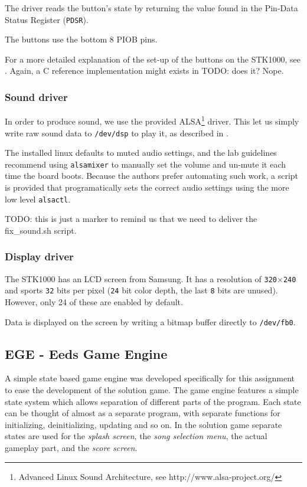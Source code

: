 The driver reads the button's state by returning the value found in the Pin-Data Status Register (\texttt{PDSR}).

The buttons use the bottom 8 PIOB pins.

For a more detailed explanation of the set-up of the buttons on the STK1000, see \cite{tdt4258-1}. Again, a C reference implementation might exists in \cite{4258-2} TODO: does it? Nope.

\subsubsection{Sound driver}
In order to produce sound, we use the provided ALSA\footnote{Advanced Linux Sound Architecture, see http://www.alsa-project.org/} driver.
This let us simply write raw sound data to \texttt{/dev/dsp} to play it, as described in \cite{lab-compendium}.

The installed linux defaults to muted audio settings, and the lab guidelines recommend using \texttt{alsamixer} to manually set the volume and un-mute it each time the board boots.
Because the authors prefer automating such work, a script is provided that programatically sets the correct audio settings using the more low level \texttt{alsactl}.

TODO: this is just a marker to remind us that we need to deliver the fix_sound.sh script.

\subsubsection{Display driver}
The STK1000 has an LCD screen from Samsung.
It has a resolution of \texttt{320}$\times$\texttt{240} and sports \texttt{32} bits per pixel (\texttt{24} bit color depth, the last \texttt{8} bits are unused)\cite{lab-compendium}.
However, only 24 of these are enabled by default\cite{avr32-disp}.

Data is displayed on the screen by writing a bitmap buffer directly to \texttt{/dev/fb0}.


    \subsection{EGE  - Eeds Game Engine}

    A simple state based game engine was developed specifically for this assignment to ease the development of the solution game.
    The game engine features a simple state system which allows separation of different parts of the program.
    Each state can be thought of almost as a separate program, with separate functions for initializing, deinitializing, updating and so on.
    In the solution game separate states are used for the \textit{splash screen}, the \textit{song selection menu}, the actual gameplay part, and the \textit{score screen}.

